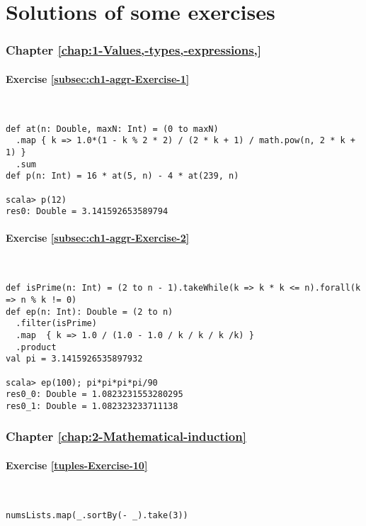 \chapter{Solutions of some exercises}

\subsection*{Chapter \ref{chap:1-Values,-types,-expressions,}}

\subsubsection*{Exercise \ref{subsec:ch1-aggr-Exercise-1}}

~
\begin{lstlisting}
def at(n: Double, maxN: Int) = (0 to maxN)
  .map { k => 1.0*(1 - k % 2 * 2) / (2 * k + 1) / math.pow(n, 2 * k + 1) }
  .sum
def p(n: Int) = 16 * at(5, n) - 4 * at(239, n)

scala> p(12)
res0: Double = 3.141592653589794
\end{lstlisting}


\subsubsection*{Exercise \ref{subsec:ch1-aggr-Exercise-2}}

~
\begin{lstlisting}
def isPrime(n: Int) = (2 to n - 1).takeWhile(k => k * k <= n).forall(k => n % k != 0)
def ep(n: Int): Double = (2 to n)
  .filter(isPrime)
  .map  { k => 1.0 / (1.0 - 1.0 / k / k / k /k) }
  .product
val pi = 3.1415926535897932

scala> ep(100); pi*pi*pi*pi/90
res0_0: Double = 1.0823231553280295
res0_1: Double = 1.082323233711138 
\end{lstlisting}


\subsection*{Chapter \ref{chap:2-Mathematical-induction}}

\subsubsection*{Exercise \ref{tuples-Exercise-10}}

~
\begin{lstlisting}
numsLists.map(_.sortBy(- _).take(3))
\end{lstlisting}


